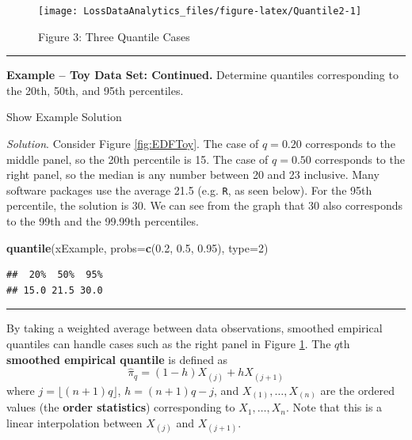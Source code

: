 \documentclass[]{book}
\newenvironment{Shaded}{\begin{snugshade}}{\end{snugshade}}
\newcommand{\KeywordTok}[1]{\textcolor[rgb]{0.13,0.29,0.53}{\textbf{{#1}}}}
\newcommand{\DataTypeTok}[1]{\textcolor[rgb]{0.13,0.29,0.53}{{#1}}}
\newcommand{\DecValTok}[1]{\textcolor[rgb]{0.00,0.00,0.81}{{#1}}}
\newcommand{\FloatTok}[1]{\textcolor[rgb]{0.00,0.00,0.81}{{#1}}}
\newcommand{\NormalTok}[1]{{#1}}
\theoremstyle{definition}
\theoremstyle{definition}
\theoremstyle{definition}
\theoremstyle{remark}
\begin{document}
\begin{figure}

{\centering \texttt{[image: LossDataAnalytics\_files/figure-latex/Quantile2-1]} 

}

\caption{Figure 3: Three Quantile Cases}\label{fig:Quantile2}
\end{figure}

\begin{center}\rule{0.5\linewidth}{\linethickness}\end{center}

\textbf{Example -- Toy Data Set: Continued.} Determine quantiles
corresponding to the 20th, 50th, and 95th percentiles.

Show Example Solution

\hypertarget{toggleExampleToyq}{}
\emph{Solution}. Consider Figure \ref{fig:EDFToy}. The case of
\(q=0.20\) corresponds to the middle panel, so the 20th percentile is
15. The case of \(q=0.50\) corresponds to the right panel, so the median
is any number between 20 and 23 inclusive. Many software packages use
the average 21.5 (e.g. \texttt{R}, as seen below). For the 95th
percentile, the solution is 30. We can see from the graph that 30 also
corresponds to the 99th and the 99.99th percentiles.

\begin{Shaded}
\begin{Highlighting}[]
\KeywordTok{quantile}\NormalTok{(xExample, }\DataTypeTok{probs=}\KeywordTok{c}\NormalTok{(}\FloatTok{0.2}\NormalTok{, }\FloatTok{0.5}\NormalTok{, }\FloatTok{0.95}\NormalTok{), }\DataTypeTok{type=}\DecValTok{2}\NormalTok{)}
\end{Highlighting}
\end{Shaded}

\begin{verbatim}
##  20%  50%  95% 
## 15.0 21.5 30.0
\end{verbatim}

\begin{center}\rule{0.5\linewidth}{\linethickness}\end{center}

By taking a weighted average between data observations, smoothed
empirical quantiles can handle cases such as the right panel in Figure
\ref{fig:Quantile2}. The \(q\)th \textbf{smoothed empirical quantile} is
defined as \[\hat{\pi}_q = (1-h) X_{(j)} + h X_{(j+1)}\] where
\(j=\lfloor(n+1)q\rfloor\), \(h=(n+1)q-j\), and
\(X_{(1)}, \ldots, X_{(n)}\) are the ordered values (the \textbf{order
statistics}) corresponding to \(X_1, \ldots, X_n\). Note that this is a
linear interpolation between \(X_{(j)}\) and \(X_{(j+1)}\).
\end{document}
